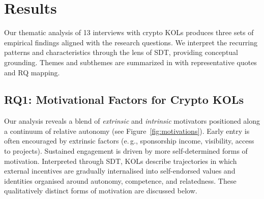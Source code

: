 
\section{Results}\label{sec:results}

Our thematic analysis of 13 interviews with crypto KOLs produces three sets of empirical findings aligned with the research questions. We interpret the recurring patterns and characteristics through the lens of SDT, providing conceptual grounding. Themes and subthemes are summarized in  with representative quotes and RQ mapping.

\subsection{RQ1: Motivational Factors for Crypto KOLs}\label{sec:rq1}

Our analysis reveals a blend of \emph{extrinsic} and \emph{intrinsic} motivators positioned along a continuum of relative autonomy (see Figure~\ref{fig:motivations}). Early entry is often encouraged by extrinsic factors (e.\,g., sponsorship income, visibility, access to projects). Sustained engagement is driven by more self-determined forms of motivation. Interpreted through SDT, KOLs describe trajectories in which external incentives are gradually internalised into self-endorsed values and identities organised around autonomy, competence, and relatedness. These qualitatively distinct forms of motivation are discussed below.%

